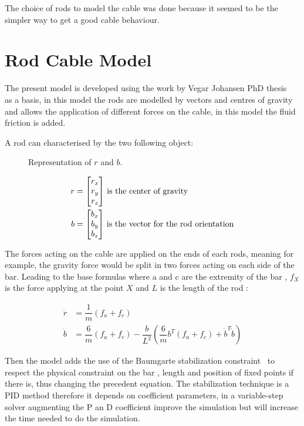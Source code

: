 The choice of rods to model the cable was done because it seemed to be the simpler
way to get a good cable behaviour.
\section{Rod Cable Model}

The present model is developed using the work by Vegar Johansen PhD thesis~\cite{johansen2007modelling} as a basis, in this model the rods are modelled by vectors and centres of gravity and allows the application of different forces on the cable, in this model the fluid friction is added.

A rod can characterised by the two following object:

\begin{figure}[H]
\centering
{} %
{

}
\caption{Representation of $r$ and $b$.}
\label{fig:draw_ref_rb}
\end{figure}

\begin{align}
r &= \begin{bmatrix}
    r_x \\
    r_y \\
    r_z
\end{bmatrix}\, \textnormal{is the center of gravity}\\
b &= \begin{bmatrix}
    b_x \\
    b_y \\
    b_z
\end{bmatrix}\, \textnormal{is the vector for the rod orientation}
\end{align}

The forces acting on the cable are applied on the ends of each rods, meaning for example, the gravity force would be split in two forces acting on each side of the bar. Leading to the base formulas where a and c are the extremity of the bar ,  $f_X$ is the force applying at the point $X$ and $L$ is the length of the rod :

\begin{align}
\ddot{r} &= \dfrac{1}{m}  (f_a+f_c) \\
\ddot{b} &=  \dfrac{6}{m}(f_a+f_c) - \dfrac{b}{L^{2}}  (\dfrac{6}{m}b^{T}(f_a+f_c)+\dot{b}^{T}\dot{b}) 
\end{align}



Then the model adds the use of the Baumgarte stabilization constraint~\cite{baumgarte1972stabilization} to respect the physical constraint on the bar , length and position of fixed points if there is, thus changing the precedent equation. 
The stabilization technique is a PID method therefore it depends on coefficient parameters, in a variable-step solver augmenting the P an D coefficient improve the simulation but will increase the time needed to do the simulation.

